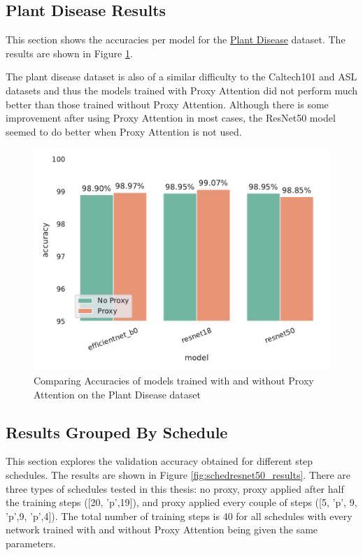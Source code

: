\documentclass[a4paper,11pt,openright]{book}
\begin{document}
\subsection{Plant Disease Results}
This section shows the accuracies per model for the \href{https://www.kaggle.com/datasets/rajibdpi/plant-disease-dataset}{Plant Disease} dataset. The results are shown in Figure \ref{fig:plantdisease_results}. 

The plant disease dataset is also of a similar difficulty to the Caltech101 and ASL datasets and thus the models trained with Proxy Attention did not perform much better than those trained without Proxy Attention. Although there is some improvement after using Proxy Attention in most cases, the ResNet50 \cite{heDeepResidualLearning2016} model seemed to do better when Proxy Attention is not used. 
\begin{figure}[!htb]
    \centering
    \includegraphics[width=.6\linewidth]{results/plantdisease_results.pdf}
    \caption{Comparing Accuracies of models trained with and without Proxy Attention on the Plant Disease dataset}
    \label{fig:plantdisease_results}
\end{figure}

\subsection{Results Grouped By Schedule}
This section explores the validation accuracy obtained for different step schedules. The results are shown in Figure \ref{fig:schedresnet50_results}. 
There are three types of schedules tested in this thesis: no proxy, proxy applied after half the training steps ([20, 'p',19]), and proxy applied every couple of steps ([5, 'p', 9, 'p',9, 'p',4]). The total number of training steps is 40 for all schedules with every network trained with and without Proxy Attention being given the same parameters. 
\end{document}
